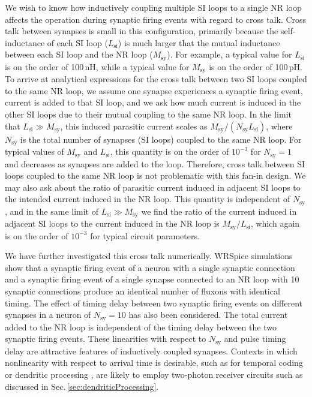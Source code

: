 \documentclass[aip,amsmath,amssymb,reprint,nofootinbib]{revtex4-1}
\begin{document}
We wish to know how inductively coupling multiple SI loops to a single NR loop affects the operation during synaptic firing events with regard to cross talk. Cross talk between synapses is small in this configuration, primarily because the self-inductance of each SI loop ($L_{\mathrm{si}}$) is much larger that the mutual inductance between each SI loop and the NR loop ($M_{\mathrm{sy}}$). For example, a typical value for $L_{\mathrm{si}}$ is on the order of 100\,nH, while a typical value for $M_{\mathrm{sy}}$ is on the order of 100\,pH. To arrive at analytical expressions for the cross talk between two SI loops coupled to the same NR loop, we assume one synapse experiences a synaptic firing event, current is added to that SI loop, and we ask how much current is induced in the other SI loops due to their mutual coupling to the same NR loop. In the limit that $L_{\mathrm{si}} \gg M_{\mathrm{sy}}$, this induced parasitic current scales as $M_{\mathrm{sy}}/(N_{\mathrm{sy}}L_{\mathrm{si}})$, where $N_{\mathrm{sy}}$ is the total number of synapses (SI loops) coupled to the same NR loop. For typical values of $M_{\mathrm{sy}}$ and $L_{\mathrm{si}}$, this quantity is on the order of $10^{-3}$ for $N_{\mathrm{sy}}=1$ and decreases as synapses are added to the loop. Therefore, cross talk between SI loops coupled to the same NR loop is not problematic with this fan-in design. We may also ask about the ratio of parasitic current induced in adjacent SI loops to the intended current induced in the NR loop. This quantity is independent of $N_{\mathrm{sy}}$, and in the same limit of $L_{\mathrm{si}} \gg M_{\mathrm{sy}}$ we find the ratio of the current induced in adjacent SI loops to the current induced in the NR loop is $M_{\mathrm{sy}}/L_{\mathrm{si}}$, which again is on the order of $10^{-3}$ for typical circuit parameters.

We have further investigated this cross talk numerically. WRSpice simulations show that a synaptic firing event of a neuron with a single synaptic connection and a synaptic firing event of a single synapse connected to an NR loop with 10 synaptic connections produce an identical number of fluxons with identical timing. The effect of timing delay between two synaptic firing events on different synapses in a neuron of $N_{\mathrm{sy}} = 10$ has also been considered. The total current added to the NR loop is independent of the timing delay between the two synaptic firing events. These linearities with respect to $N_{\mathrm{sy}}$ and pulse timing delay are attractive features of inductively coupled synapses. Contexts in which nonlinearity with respect to arrival time is desirable, such as for temporal coding \cite{thde2001,sase2001} or dendritic processing \cite{brcl2010,haah2015}, are likely to employ two-photon receiver circuits such as discussed in Sec.\,\ref{sec:dendriticProcessing}. 
 
\end{document}
